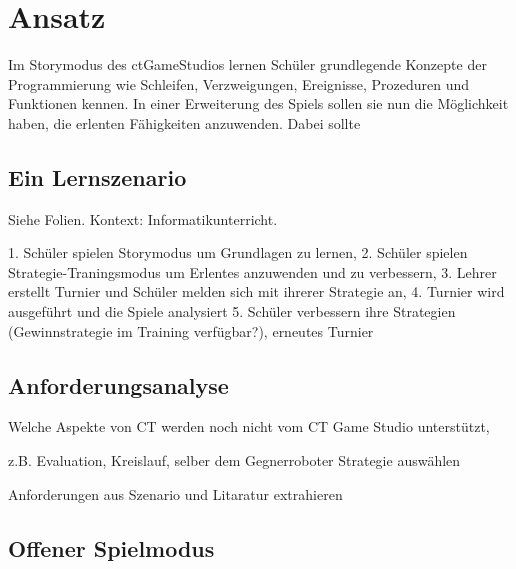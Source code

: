 \chapter{Ansatz}

Im Storymodus des ctGameStudios lernen Schüler grundlegende Konzepte der Programmierung wie
Schleifen, Verzweigungen, Ereignisse, Prozeduren und Funktionen kennen. In einer Erweiterung des
Spiels sollen sie nun die Möglichkeit haben, die erlenten Fähigkeiten anzuwenden. Dabei sollte 

\section{Ein Lernszenario}

Siehe Folien. Kontext: Informatikunterricht.

1. Schüler spielen Storymodus um Grundlagen zu lernen,
2. Schüler spielen Strategie-Traningsmodus um Erlentes anzuwenden und zu verbessern,
3. Lehrer erstellt Turnier und Schüler melden sich mit ihrerer Strategie an,
4. Turnier wird ausgeführt und die Spiele analysiert
5. Schüler verbessern ihre Strategien (Gewinnstrategie im Training verfügbar?), erneutes Turnier

\section{Anforderungsanalyse}

Welche Aspekte von CT werden noch nicht vom CT Game Studio unterstützt,

z.B. Evaluation, Kreislauf, selber dem Gegnerroboter Strategie auswählen

Anforderungen aus Szenario und Litaratur extrahieren

\section{Offener Spielmodus}

